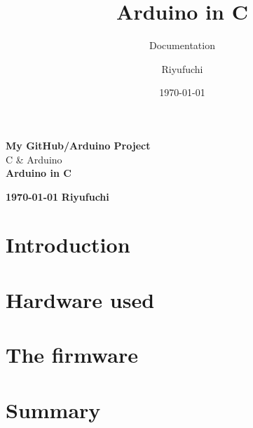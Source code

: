 \documentclass[12pt,a4paper,titlepage]{scrreprt}
\title{\vspace{6cm}Arduino in C}
\subtitle{Documentation}
\author{Riyufuchi}
\date{\today}
\begin{document}
	
	
	\begin{titlepage}
		\begin{center}
			{\Large \textbf{My GitHub/Arduino Project}} \\
			{\Large C \& Arduino} \\
			\vfill
			{\Huge \textbf{Arduino in C}}
			\vfill
		\end{center}
		{\large\textbf{ \today}} \hfill {\large \textbf{Riyufuchi}}
	\end{titlepage}
	
	\tableofcontents
	\newpage
	
	\clearpage
	\printglossary[type=main, title=Glossary]
	\printglossary[type=\acronymtype, style=mystyle]
	\clearpage
	\lstlistoflistings

	
	\chapter{Introduction}
	
	
	\chapter{Hardware used}
	
	
	\chapter{The firmware}
	
	
	
	\chapter*{Summary}
\end{document}
